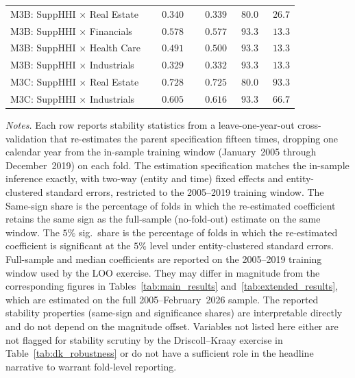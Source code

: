 \begin{table}[!htbp]
\begin{threeparttable}
\begin{tabular}{l c c c c}
M3B: SuppHHI $\times$ Real Estate     & $\phantom{-}0.340$ & $\phantom{-}0.339$ & $\phantom{0}80.0$ & $\phantom{0}26.7$ \\
M3B: SuppHHI $\times$ Financials      & $\phantom{-}0.578$ & $\phantom{-}0.577$ & $\phantom{0}93.3$ & $\phantom{0}13.3$ \\
M3B: SuppHHI $\times$ Health Care     & $\phantom{-}0.491$ & $\phantom{-}0.500$ & $\phantom{0}93.3$ & $\phantom{0}13.3$ \\
M3B: SuppHHI $\times$ Industrials     & $\phantom{-}0.329$ & $\phantom{-}0.332$ & $\phantom{0}93.3$ & $\phantom{0}13.3$ \\
M3C: SuppHHI $\times$ Real Estate     & $\phantom{-}0.728$ & $\phantom{-}0.725$ & $\phantom{0}80.0$ & $\phantom{0}93.3$ \\
M3C: SuppHHI $\times$ Industrials     & $\phantom{-}0.605$ & $\phantom{-}0.616$ & $\phantom{0}93.3$ & $\phantom{0}66.7$ \\
\bottomrule
\end{tabular}

\begin{tablenotes}[flushleft]
\footnotesize
\item \textit{Notes.} Each row reports stability statistics from a
leave-one-year-out cross-validation that re-estimates the parent specification
fifteen times, dropping one calendar year from the in-sample training window
(January~2005 through December~2019) on each fold. The estimation specification
matches the in-sample inference exactly, with two-way (entity and time) fixed
effects and entity-clustered standard errors, restricted to the 2005--2019
training window. The Same-sign share is the percentage of folds in which the
re-estimated coefficient retains the same sign as the full-sample (no-fold-out)
estimate on the same window. The $5\%$ sig.\ share is the percentage of folds
in which the re-estimated coefficient is significant at the $5\%$ level under
entity-clustered standard errors. Full-sample and median coefficients are
reported on the 2005--2019 training window used by the LOO exercise. They
may differ in magnitude from the corresponding figures in
Tables~\ref{tab:main_results} and~\ref{tab:extended_results}, which are
estimated on the full 2005--February~2026 sample. The reported stability
properties (same-sign and significance shares) are interpretable directly
and do not depend on the magnitude offset. Variables not listed here either
are not flagged for stability scrutiny by the Driscoll--Kraay exercise in
Table~\ref{tab:dk_robustness} or do not have a sufficient role in the
headline narrative to warrant fold-level reporting.
\end{tablenotes}
\end{threeparttable}

\end{table}
